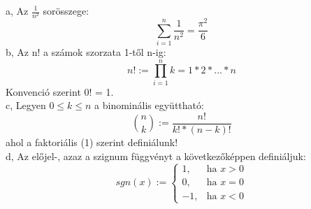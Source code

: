 \documentclass{article}
\begin{document}
a, Az $\frac{1}{n^2}$ sorösszege: \[\sum_{i=1}^n\frac{1}{n^2}=\frac{\pi^2}{6}\]
b, Az n! a számok szorzata 1-től n-ig: \[n!:=\prod_{i=1}^nk=1*2*...*n\]
Konvenció szerint 0! = 1.
\\c, Legyen $0\le k\le n$ a binominális együttható: \[\binom{n}{k}:=\frac{n!}{k!*(n-k)!}\]
ahol a faktoriális (\color{red}1\color{black}) szerint definiálunk!
\\d, Az előjel-, azaz a szignum függvényt a következőképpen definiáljuk: \[sgn(x):= 
\begin{cases} 
1, & \text{ha }x>0
\\0, & \text{ha }x=0
\\-1, & \text{ha }x<0
\end{cases}\]
\end{document}
